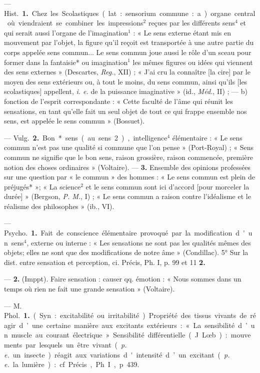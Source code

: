 \begin{itemize}[leftmargin=1cm, label=, itemsep=1pt]
 — \si{Hist.} {\bf 1.} Chez les
Scolastiques (lat. : sensorium commune :
a) organe central où viendraient se combiner les impressions$^2$
reçues par les différents sens$^4$ et qui
serait aussi l'organe de l'imagination$^1$ : « Le sens externe étant mis en
mouvement par l'objet, la figure
qu’il reçoit est transportée à une
autre partie du corps appelée sens
commun... Le sens commun joue
aussi le rôle d’un sceau pour former
dans la fantaisie* ou imagination$^1$
les mêmes figures ou idées qui viennent des sens externes » (Descartes,
{\it Reg.}, XII) ; « J'ai cru la connaître
[la cire] par le moyen des sens extérieurs ou, à tout le moins, du sens
commun, ainsi qu'ils [les scolastiques] appellent, {\it i. e.} de la puissance imaginative » (id., \si{{\it Méd.}}, II) ;
— b) fonction de l'esprit correspondante : « Cette faculté de l’âme qui
réunit les sensations, en tant qu'elle
fait un seul objet de tout ce qui
frappe ensemble nos sens, est appelée
le sens commun » (Bossuet).

— \si{Vulg.} {\bf 2.} Bon* sens (au sens 2),
intelligence$^4$ élémentaire : « Le sens
commun n’est pas une qualité si
commune que l’on pense » (Port-Royal) ; « Sens commun ne signifie
que le bon sens, raison grossière,
raison commencée, première notion
des choses ordinaires » (Voltaire). —
 {\bf 3.} Ensemble des opinions professées
sur une question par « le commun »
des hommes : « Le sens commun
est plein de préjugés* »; « La science$^2$
et le sens commun sont ici d'accord
[pour morceler la durée] » (Bergson,
{\it P. M.}, I) ; « Le sens commun a
raison contre l'idéalisme et le réalisme des philosophes » (ib., VI).

 — \si{Psycho.} {\bf 1.} Fait de
conscience élémentaire provoqué par
la modification d'un sens$^4$, externe
ou interne : « Les sensations ne sont
pas les qualités mêmes des objets;
elles ne sont que des modifications
de notre âme » (Condillac). 5° Sur
la dist. entre sensation et perception,
ci. Précis, Ph. I, p. 99 et 11 {\bf 2.}

— {\bf 2.} (Imppt). Faire sensation :
causer qq. émotion : « Nous sommes
dans un temps où rien ne fait une
grande sensation » (Voltaire).

 — M. \si{Phol.} {\bf 1.} (Syn. : excitabilité ou irritabilité). Propriété des
tissus vivants de réagir d’une certaine manière aux excitants extérieurs : « La sensibilité d’un muscle
au courant électrique ». Sensibilité
différentielle (J. Lœb) : mouvements
par lesquels un être vivant ({\it p. e.} un
insecte) réagit aux variations d'intensité d’un excitant ({\it p. e.} la lumière) : cf. Précis, Ph. I, p. 439.


\end{itemize}
